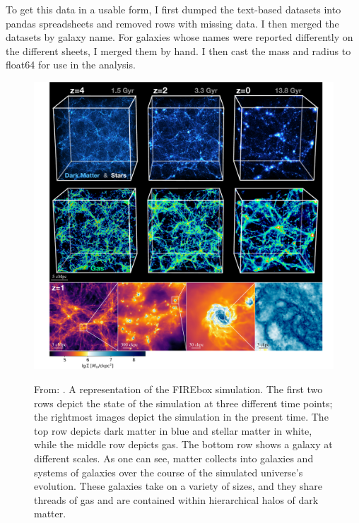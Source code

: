 To get this data in a usable form, I first dumped the text-based datasets into pandas spreadsheets and removed rows with missing data. I then merged the datasets by galaxy name. For galaxies whose names were reported differently on the different sheets, I merged them by hand. I then cast the mass and radius to float64 for use in the analysis.


\begin{figure}
    \includegraphics*[width=\textwidth]{figs/feldmann/fig1.pdf}
    \label{fig:feldmann-visual}
    \caption{
        From: \cite{feldmannFIREboxSimulatingGalaxies2022}. A representation of the FIREbox simulation. The first two rows depict the state of the simulation at three different time points; the rightmost images depict the simulation in the present time. The top row depicts dark matter in blue and stellar matter in white, while the middle row depicts gas. The bottom row shows a galaxy at different scales. As one can see, matter collects into galaxies and systems of galaxies over the course of the simulated universe's evolution. These galaxies take on a variety of sizes, and they share threads of gas and are contained within hierarchical halos of dark matter.
    }
\end{figure}

